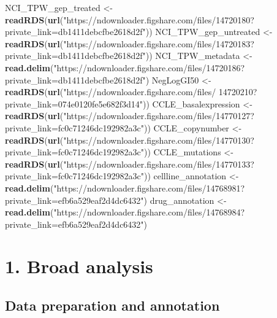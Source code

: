\documentclass[]{article}
\newenvironment{Shaded}{\begin{snugshade}}{\end{snugshade}}
\newcommand{\KeywordTok}[1]{\textcolor[rgb]{0.13,0.29,0.53}{\textbf{#1}}}
\newcommand{\NormalTok}[1]{#1}
\newcommand{\StringTok}[1]{\textcolor[rgb]{0.31,0.60,0.02}{#1}}
\begin{document}
\begin{Shaded}
\begin{Highlighting}[]
\NormalTok{NCI_TPW_gep_treated <-}\StringTok{ }\KeywordTok{readRDS}\NormalTok{(}\KeywordTok{url}\NormalTok{(}\StringTok{"https://ndownloader.figshare.com/files/14720180?private_link=db1411debcfbe2618d2f"}\NormalTok{))}
\NormalTok{NCI_TPW_gep_untreated <-}\StringTok{ }\KeywordTok{readRDS}\NormalTok{(}\KeywordTok{url}\NormalTok{(}\StringTok{"https://ndownloader.figshare.com/files/14720183?private_link=db1411debcfbe2618d2f"}\NormalTok{))}
\NormalTok{NCI_TPW_metadata <-}\StringTok{ }\KeywordTok{read.delim}\NormalTok{(}\StringTok{"https://ndownloader.figshare.com/files/14720186?private_link=db1411debcfbe2618d2f"}\NormalTok{)}
\NormalTok{NegLogGI50 <-}\StringTok{ }\KeywordTok{readRDS}\NormalTok{(}\KeywordTok{url}\NormalTok{(}\StringTok{"https://ndownloader.figshare.com/files/ 14720210?private_link=074e0120fe5e682f3d14"}\NormalTok{))}
\NormalTok{CCLE_basalexpression <-}\StringTok{ }\KeywordTok{readRDS}\NormalTok{(}\KeywordTok{url}\NormalTok{(}\StringTok{"https://ndownloader.figshare.com/files/14770127?private_link=fc0c71246dc192982a3c"}\NormalTok{))}
\NormalTok{CCLE_copynumber <-}\StringTok{ }\KeywordTok{readRDS}\NormalTok{(}\KeywordTok{url}\NormalTok{(}\StringTok{"https://ndownloader.figshare.com/files/14770130?private_link=fc0c71246dc192982a3c"}\NormalTok{))}
\NormalTok{CCLE_mutations <-}\StringTok{ }\KeywordTok{readRDS}\NormalTok{(}\KeywordTok{url}\NormalTok{(}\StringTok{"https://ndownloader.figshare.com/files/14770133?private_link=fc0c71246dc192982a3c"}\NormalTok{))}
\NormalTok{cellline_annotation <-}\KeywordTok{read.delim}\NormalTok{(}\StringTok{"https://ndownloader.figshare.com/files/14768981?private_link=efb6a529eaf2d4dc6432"}\NormalTok{)}
\NormalTok{drug_annotation <-}\StringTok{ }\KeywordTok{read.delim}\NormalTok{(}\StringTok{"https://ndownloader.figshare.com/files/14768984?private_link=efb6a529eaf2d4dc6432"}\NormalTok{)}
\end{Highlighting}
\end{Shaded}

\hypertarget{broad-analysis}{%
\section{1. Broad analysis}\label{broad-analysis}}

\hypertarget{data-preparation-and-annotation}{%
\subsection{Data preparation and
annotation}\label{data-preparation-and-annotation}}
\end{document}
